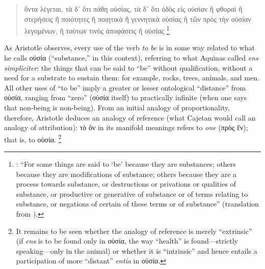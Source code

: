 \begin{quotation}
ὄντα λέγεται, τὰ δ᾽ ὅτι πάθη οὐσίας, τὰ δ᾽ ὅτι ὁδὸς εἰς οὐσίαν ἢ φθοραὶ ἢ στερήσεις ἢ ποιότητες ἢ ποιητικὰ ἢ γεννητικὰ οὐσίας ἢ τῶν πρὸς τὴν οὐσίαν λεγομένων, ἢ τούτων τινὸς ἀποφάσεις ἢ οὐσίας%
%
\footnote{\Cite[Γ, 2, 100ba8-10]{aristotle:metaphysics}: “For some things are said to ‘be’ because they are substances; others because they are modifications of substance; others because they are a process towards substance, or destructions or privations or qualities of substance, or productive or generative of substance or of terms relating to substance, or negations of certain of these terms or of substance” (translation from \cite{aristotle:metaphysics:en}).}
\end{quotation}
%
As Aristotle observes, every use of the verb \emph{to be} is in some way related to what he calls οὐσία (“substance,” in this context), referring to what Aquinas called \emph{ens simpliciter}: the things that can be said to “be” without qualification, without a need for a substrate to sustain them: for example, rocks, trees, animals, and men. All other uses of “to be” imply a greater or lesser ontological “distance” from οὐσία, ranging from “zero” (οὐσία itself) to practically infinite (when one says that non-being is non-being). From an initial analogy of proportionality, therefore, Aristotle deduces an analogy of reference (what Cajetan would call an analogy of attribution): τὸ ὄν in its manifold meanings refers to \emph{one} (πρὸς ἓν); that is, to οὐσία.%
%
\footnote{It remains to be seen whether the analogy of reference is merely “extrinsic” (if \emph{ens} is to be found only in οὐσία, the way “health” is found—strictly speaking—only in the animal) or whether it is “intrinsic” and hence entails a participation of more “distant” \emph{entia} in οὐσία.}

